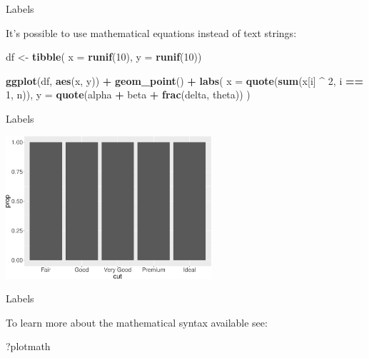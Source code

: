\documentclass[ignorenonframetext,]{beamer}
\newenvironment{Shaded}{\begin{snugshade}}{\end{snugshade}}
\newcommand{\DataTypeTok}[1]{\textcolor[rgb]{0.13,0.29,0.53}{#1}}
\newcommand{\DecValTok}[1]{\textcolor[rgb]{0.00,0.00,0.81}{#1}}
\newcommand{\KeywordTok}[1]{\textcolor[rgb]{0.13,0.29,0.53}{\textbf{#1}}}
\newcommand{\NormalTok}[1]{#1}
\newcommand{\OperatorTok}[1]{\textcolor[rgb]{0.81,0.36,0.00}{\textbf{#1}}}
\newcommand{\StringTok}[1]{\textcolor[rgb]{0.31,0.60,0.02}{#1}}
\begin{document}
\begin{frame}[fragile]{Labels}
\protect\hypertarget{labels-7}{}

It's possible to use mathematical equations instead of text strings:

\begin{Shaded}
\begin{Highlighting}[]
\NormalTok{df <-}\StringTok{ }\KeywordTok{tibble}\NormalTok{(}
  \DataTypeTok{x =} \KeywordTok{runif}\NormalTok{(}\DecValTok{10}\NormalTok{),}
  \DataTypeTok{y =} \KeywordTok{runif}\NormalTok{(}\DecValTok{10}\NormalTok{))}

\KeywordTok{ggplot}\NormalTok{(df, }\KeywordTok{aes}\NormalTok{(x, y)) }\OperatorTok{+}
\StringTok{  }\KeywordTok{geom_point}\NormalTok{() }\OperatorTok{+}
\StringTok{  }\KeywordTok{labs}\NormalTok{(}
    \DataTypeTok{x =} \KeywordTok{quote}\NormalTok{(}\KeywordTok{sum}\NormalTok{(x[i] }\OperatorTok{^}\StringTok{ }\DecValTok{2}\NormalTok{, i }\OperatorTok{==}\StringTok{ }\DecValTok{1}\NormalTok{, n)),}
    \DataTypeTok{y =} \KeywordTok{quote}\NormalTok{(alpha }\OperatorTok{+}\StringTok{ }\NormalTok{beta }\OperatorTok{+}\StringTok{ }\KeywordTok{frac}\NormalTok{(delta, theta))}
\NormalTok{  )}
\end{Highlighting}
\end{Shaded}

\end{frame}

\begin{frame}{Labels}
\protect\hypertarget{labels-8}{}

\begin{center}\includegraphics[height=200px]{data-visualization_files/figure-beamer/unnamed-chunk-119-1} \end{center}

\end{frame}

\begin{frame}[fragile]{Labels}
\protect\hypertarget{labels-9}{}

To learn more about the mathematical syntax available see:

\begin{Shaded}
\begin{Highlighting}[]
\NormalTok{?plotmath}
\end{Highlighting}
\end{Shaded}

\end{frame}
\end{document}
